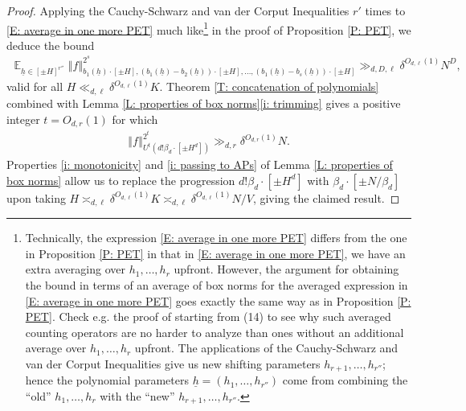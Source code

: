 \documentclass[11pt]{amsart}
\theoremstyle{definition}
\DeclareMathOperator*{\E}{\mathbb{E}}
\newcommand{\uh}{{\underline{h}}}
\newcommand{\norm}[1]{\left\Vert #1\right\Vert}
\begin{document}
\begin{proof}
    Applying the Cauchy-Schwarz and van der Corput Inequalities $r'$ times to \eqref{E: average in one more PET} much like\footnote{Technically, the expression \eqref{E: average in one more PET} differs from the one in Proposition \ref{P: PET} in that in \eqref{E: average in one more PET}, we have an extra averaging over $h_1, \ldots, h_r$ upfront. However, the argument for obtaining the bound in terms of an average of box norms for the averaged expression in \eqref{E: average in one more PET} goes exactly the same way as in Proposition \ref{P: PET}. Check e.g. the proof of \cite[Corollary 4.3]{Kuc22b} starting from (14) to see why such averaged counting operators are no harder to analyze than ones without an additional average over $h_1, \ldots, h_r$ upfront.
    The applications of the Cauchy-Schwarz and van der Corput Inequalities give us new shifting parameters $h_{r+1}, \ldots, h_{r''}$; hence the polynomial parameters $\uh=(h_1, \ldots, h_{r''})$ come from combining the ``old'' $h_1, \ldots, h_r$ with the ``new'' $h_{r+1}, \ldots, h_{r''}$.}  in the proof of Proposition \ref{P: PET}, we deduce the bound
   \begin{align*}
       \E_{\uh\in[\pm H]^{r''}}\norm{f}_{b_1(\uh)\cdot[\pm H], (b_1(\uh)-b_2(\uh))\cdot[\pm H], \ldots, (b_1(\uh)-b_s(\uh))\cdot[\pm H]}^{2^s} \gg_{d, D, \ell} \delta^{O_{d,\ell}(1)}N^D,
   \end{align*}
   valid for all $H\ll_{d,\ell} \delta^{O_{d,\ell}(1)}K$.  Theorem \ref{T: concatenation of polynomials} combined with Lemma \ref{L: properties of box norms}\eqref{i: trimming} gives a positive integer $t=O_{d,r}(1)$ for which
    \begin{align*}
    \norm{f}_{U^t(d!\beta_d\cdot[\pm H^d])}^{2^{t}}\gg_{d,r} \delta^{O_{d,r}(1)} N.
\end{align*}
Properties \eqref{i: monotonicity} and \eqref{i: passing to APs} of Lemma \ref{L: properties of box norms} allow us to replace the progression $d!\beta_d\cdot[\pm H^d]$ with $\beta_d\cdot[\pm N/\beta_d]$ upon taking $H\asymp_{d,\ell} \delta^{O_{d,\ell}(1)}K\asymp_{d,\ell} \delta^{O_{d,\ell}(1)}N/V$, giving the claimed result.

    
\end{proof}













  

\end{document}

